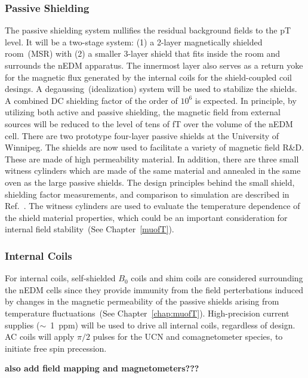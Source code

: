 \subsubsection{Passive Shielding}
The passive shielding system nullifies the residual background fields
to the pT level. It will be a two-stage system: (1) a 2-layer
magnetically shielded room~(MSR) with (2) a smaller 3-layer shield
that fits inside the room and surrounds the nEDM apparatus. The
innermost layer also serves as a return yoke for the magnetic flux
generated by the internal coils for the shield-coupled coil desings. A
degaussing~(idealization) system will be used to stabilize the
shields. A combined DC shielding factor of the order of $10^6$ is
expected. In principle, by utilizing both active and passive
shielding, the magnetic field from external sources will be reduced to
the level of tens of fT over the volume of the nEDM cell.  There are
two prototype four-layer passive shields at the University of
Winnipeg. The shields are now used to facilitate a variety of magnetic
field R\&D. These are made of high permeability material. In addition,
there are three small witness cylinders which are made of the same
material and annealed in the same oven as the large passive
shields. The design principles behind the small shield, shielding
factor measurements, and comparison to simulation are described in
Ref.~\cite{martin2015large}.  The witness cylinders are used to
evaluate the temperature dependence of the shield material properties,
which could be an important consideration for internal field
stability~(See Chapter~\ref{muofT}).


\subsubsection{Internal Coils}
For internal coils, self-shielded $B_0$ coils and shim coils are
considered surrounding the nEDM cells since they provide immunity from
the field perterbations induced by changes in the magnetic
permeability of the passive shields arising from temperature
fluctuations~(See Chapter~\ref{chap:muofT}).  High-precision current
supplies ($\sim$~1~ppm) will be used to drive all internal coils,
regardless of design. AC coils will apply $\pi/2$ pulses for the UCN and
comagnetometer species, to initiate free spin precession.

\textbf{also add field mapping and magnetometers???}




